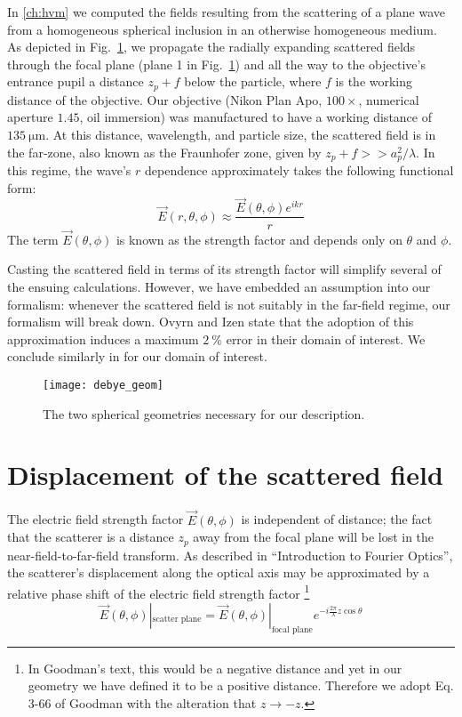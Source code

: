 In \autoref{ch:hvm} we computed the fields resulting from the scattering of
a plane wave from a homogeneous spherical inclusion in an otherwise
homogeneous medium. As depicted in Fig.~\ref{fig:debye_schematic}, we
propagate the radially expanding scattered fields through the focal plane (plane \num{1} in
Fig.~\ref{fig:debye_schematic}) and all the way to the objective's entrance pupil a distance
$z_p + f$ below the particle, where $f$ is the working distance of the objective.
Our objective  (Nikon Plan Apo, $\num{100}\times$, numerical aperture $\num{1.45}$,
oil immersion) was manufactured to have a working distance of $\SI{135}{\um}$.
At this distance, wavelength, and particle size, the scattered field is in the far-zone,
also known as the Fraunhofer zone, given by $z_p + f >> a_p^2/\lambda$. In this
regime, the wave's $r$ dependence approximately takes the following functional form:
\begin{equation*}
  \label{eq:strength_factor}
  \vec{E}(r, \theta, \phi) \approx \frac{\vec{E}(\theta, \phi)e^{ikr}}{r}
\end{equation*}
The term $\vec{E}(\theta, \phi)$ is known as the strength factor and
depends only on $\theta$ and $\phi$. 

Casting the scattered field in terms of its strength factor will simplify
several of the ensuing calculations. However, we have embedded an assumption
into our formalism: whenever the scattered field is not suitably in the far-field
regime, our formalism will break down. Ovyrn and Izen\cite{izen00} state
that the adoption of this approximation induces a maximum
$\SI{2}{\percent}$ error in their domain of interest. We conclude similarly in
\cite{app:lorenzmie_approx} for our domain of interest.

\begin{figure}
  \centering
  \texttt{[image: debye\_geom]}
  \caption{The two spherical geometries necessary for our description.}
  \label{fig:debye_schematic}
\end{figure}

\section{ Displacement of the scattered field}

The electric field strength factor $\vec{E}(\theta, \phi)$ is independent
of distance; the fact that the scatterer is a distance $z_p$ away
from the focal plane will be lost in the near-field-to-far-field transform.
As described in  ``Introduction to Fourier Optics''\cite{goodman05},
the scatterer's displacement along the optical axis may be approximated by
a relative phase shift of the electric field strength factor
\footnote{In Goodman's text\cite{goodman05}, this would be a negative
  distance and yet in our geometry we have defined it to be a positive distance.
  Therefore we adopt Eq. 3-66 of Goodman with the alteration that  $z \rightarrow -z$.}
\begin{equation*}
  \label{eq:entrance_pupil}
    \vec{E}(\theta, \phi)|_{\text{scatter plane}} = \vec{E}(\theta, \phi)|_{\text{focal plane}} e^{-i\frac{2\pi}{\lambda}z\cos{\theta} }
  \end{equation*}

